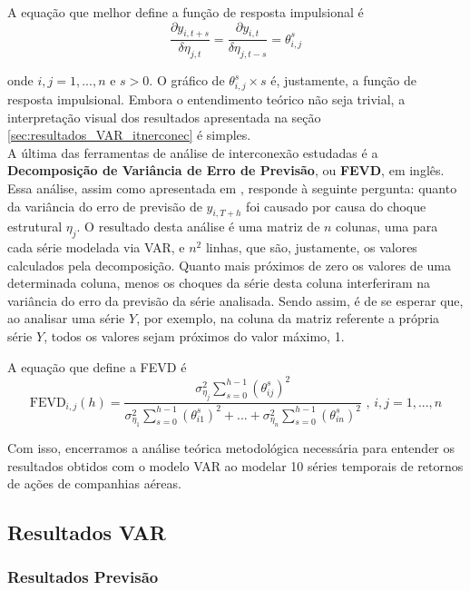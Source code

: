 \documentclass[12pt]{article}
\begin{document}
	A equação que melhor define a função de resposta impulsional é
	\begin{equation*}
		\dfrac{\partial y_{i,t+s}}{\delta \eta_{j,t}}=\dfrac{\partial y_{i,t}}{\delta \eta_{j,t-s}}=\theta^s_{i,j}
	\end{equation*}

	onde $i,j=1,...,n$ e $s>0$. O gráfico de $\theta^s_{i,j}\times s$ é, justamente, a função de resposta impulsional. Embora o entendimento teórico não seja trivial, a interpretação visual dos resultados apresentada na seção \ref{sec:resultados_VAR_itnerconec} é simples. \\
	
	A última das ferramentas de análise de interconexão estudadas é a \textbf{Decomposição de Variância de Erro de Previsão}, ou \textbf{FEVD}, em inglês. Essa análise, assim como apresentada em \cite{VAR}, responde à seguinte pergunta: quanto da variância do erro de previsão de $y_{i,T+h}$ foi causado por causa do choque estrutural $\eta_j$. O resultado desta análise é uma matriz de $n$ colunas, uma para cada série modelada via VAR, e $n^2$ linhas, que são, justamente, os valores calculados pela decomposição. Quanto mais próximos de zero os valores de uma determinada coluna, menos os choques da série desta coluna interferiram na variância do erro da previsão da série analisada. Sendo assim, é de se esperar que, ao analisar uma série $Y$, por exemplo, na coluna da matriz referente a própria série $Y$, todos os valores sejam próximos do valor máximo, 1.
	
	A equação que define a FEVD é
	\begin{equation*}
		\textrm{FEVD}_{i,j}(h)=\dfrac{\sigma^2_{\eta_j}\sum_{s=0}^{h-1}(\theta^s_{ij})^2}{\sigma^2_{\eta_1}\sum_{s=0}^{h-1}(\theta^s_{i1})^2+...+\sigma^2_{\eta_n}\sum_{s=0}^{h-1}(\theta^s_{in})^2}\mbox{   , }i,j=1,...,n
	\end{equation*}
	
	Com isso, encerramos a análise teórica metodológica necessária para entender os resultados obtidos com o modelo VAR ao modelar 10 séries temporais de retornos de ações de companhias aéreas.
	
	\subsection{Resultados VAR}
	\subsubsection{Resultados Previsão}\label{sec:resultados_VAR_previsao}
	
\end{document}
